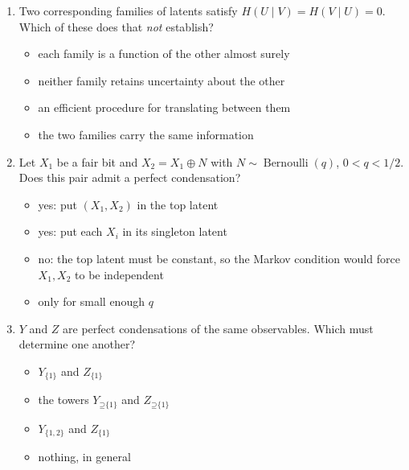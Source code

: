 \documentclass[11pt]{article}
\newcommand{\Up}{\mathord{\supseteq}}
\begin{document}
\begin{enumerate}
\item Two corresponding families of latents satisfy $H(U\mid V)=H(V\mid U)=0$.
Which of these does that \emph{not} establish?
\begin{itemize}
\item each family is a function of the other almost surely
\item neither family retains uncertainty about the other
\item an efficient procedure for translating between them
\item the two families carry the same information
\end{itemize}

\item Let $X_1$ be a fair bit and $X_2=X_1\mathbin{\oplus}N$ with
$N\sim\operatorname{Bernoulli}(q)$, $0<q<1/2$. Does this pair admit a perfect
condensation?
\begin{itemize}
\item yes: put $(X_1,X_2)$ in the top latent
\item yes: put each $X_i$ in its singleton latent
\item no: the top latent must be constant, so the Markov condition would force
$X_1,X_2$ to be independent
\item only for small enough $q$
\end{itemize}

\item $Y$ and $Z$ are perfect condensations of the same observables. Which must
determine one another?
\begin{itemize}
\item $Y_{\{1\}}$ and $Z_{\{1\}}$
\item the towers $Y_{\Up\{1\}}$ and $Z_{\Up\{1\}}$
\item $Y_{\{1,2\}}$ and $Z_{\{1\}}$
\item nothing, in general
\end{itemize}
\end{enumerate}
\end{document}
